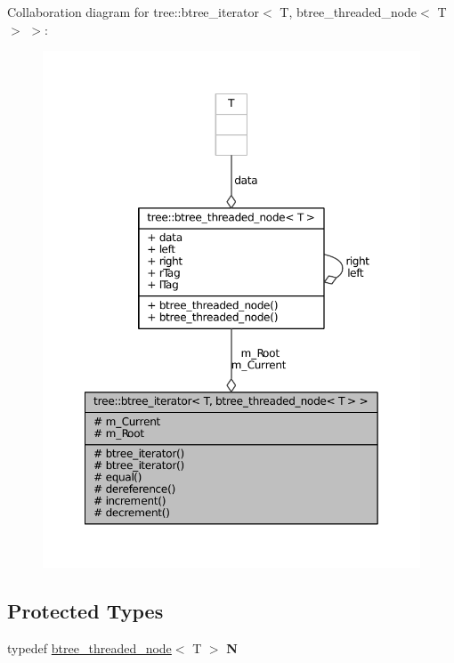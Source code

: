 \-Collaboration diagram for tree\-:\-:btree\-\_\-iterator$<$ \-T, btree\-\_\-threaded\-\_\-node$<$ \-T $>$ $>$\-:
\nopagebreak
\begin{figure}[H]
\begin{center}
\leavevmode
\includegraphics[width=350pt]{classtree_1_1btree__iterator_3_01T_00_01btree__threaded__node_3_01T_01_4_01_4__coll__graph}
\end{center}
\end{figure}
\subsection*{\-Protected \-Types}
\begin{DoxyCompactItemize}
\item 
\hypertarget{classtree_1_1btree__iterator_3_01T_00_01btree__threaded__node_3_01T_01_4_01_4_a4648c4864eba8e9052872c7d992a1114}{typedef \hyperlink{structtree_1_1btree__threaded__node}{btree\-\_\-threaded\-\_\-node}$<$ \-T $>$ {\bfseries \-N}}\label{classtree_1_1btree__iterator_3_01T_00_01btree__threaded__node_3_01T_01_4_01_4_a4648c4864eba8e9052872c7d992a1114}

\end{DoxyCompactItemize}
